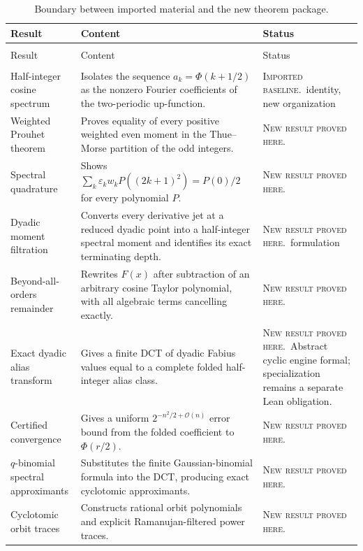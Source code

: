 \documentclass[11pt,oneside]{article}
\theoremstyle{definition}
\theoremstyle{remark}
\newcommand{\bigO}{\mathcal O}
\newcommand{\eps}{\varepsilon}
\newcommand{\PhiU}{\Phi}
\newcommand{\newresult}{\textcolor{newgreen}{\textsc{New result proved here.}}}
\newcommand{\imported}{\textcolor{importblue}{\textsc{Imported baseline.}}}
\begin{document}
{\small
\begin{longtable}{@{}>{\raggedright\arraybackslash}p{}>{\raggedright\arraybackslash}p{}>{\raggedright\arraybackslash}p{}@{}}
\caption{Boundary between imported material and the new theorem package.}\label{p1:tab:contribution-map}\\
\toprule
Result & Content & Status \\
\midrule
\endfirsthead
\multicolumn{3}{c}{\small\itshape Contribution map (continued)}\\[0.3em]
\toprule
Result & Content & Status \\
\midrule
\endhead
\midrule
\multicolumn{3}{r}{\small\itshape Continued on the next page}\\
\endfoot
\bottomrule
\endlastfoot
Half-integer cosine spectrum & Isolates the sequence $a_k=\PhiU(k+1/2)$ as the nonzero Fourier coefficients of the two-periodic up-function. & \imported\ identity, new organization \\
Weighted Prouhet theorem & Proves equality of every positive weighted even moment in the Thue--Morse partition of the odd integers. & \newresult \\
Spectral quadrature & Shows $\sum_k\eps_kw_kP((2k+1)^2)=P(0)/2$ for every polynomial $P$. & \newresult \\
Dyadic moment filtration & Converts every derivative jet at a reduced dyadic point into a half-integer spectral moment and identifies its exact terminating depth. & \newresult\ formulation \\
Beyond-all-orders remainder & Rewrites $F(x)$ after subtraction of an arbitrary cosine Taylor polynomial, with all algebraic terms cancelling exactly. & \newresult \\
Exact dyadic alias transform & Gives a finite DCT of dyadic Fabius values equal to a complete folded half-integer alias class. & \newresult\ Abstract cyclic engine formal; specialization remains a separate Lean obligation. \\
Certified convergence & Gives a uniform $2^{-n^2/2+\bigO(n)}$ error bound from the folded coefficient to $\PhiU(r/2)$. & \newresult \\
$q$-binomial spectral approximants & Substitutes the finite Gaussian-binomial formula into the DCT, producing exact cyclotomic approximants. & \newresult \\
Cyclotomic orbit traces & Constructs rational orbit polynomials and explicit Ramanujan-filtered power traces. & \newresult \\

\end{longtable}}
\end{document}
